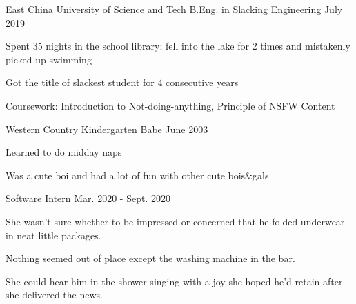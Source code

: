 \documentclass[12pt, a4paper]{yp-vita}
\begin{document}

    \medskip


    \mentry
        {East China University of Science and Tech}
        {B.Eng. in Slacking Engineering}
        {July 2019}
        {
            \begin{cvitems} %
              \item {Spent 35 nights in the school library; fell into the lake for 2 times and mistakenly picked up swimming}
              \item {Got the title of slackest student for 4 consecutive years}
              \item {Coursework: Introduction to Not-doing-anything, Principle of NSFW Content}
            \end{cvitems}
          }
    
    \smallskip

    \mentry
        {Western Country Kindergarten}
        {Babe}
        {June 2003}
        {
            \begin{cvitems} %
                \item {Learned to do midday naps}
                \item {Was a cute boi and had a lot of fun with other cute bois\&gals}
            \end{cvitems}
        }
    
    \medskip
    

    {Software Intern}
    {Mar. 2020 - Sept. 2020}
    {
        \begin{cvitems}
            \item {She wasn't sure whether to be impressed or concerned that he folded underwear in neat little packages.}
            \item {Nothing seemed out of place except the washing machine in the bar.}
            \item {She could hear him in the shower singing with a joy she hoped he'd retain after she delivered the news.}
        \end{cvitems}
    }
\end{document}
